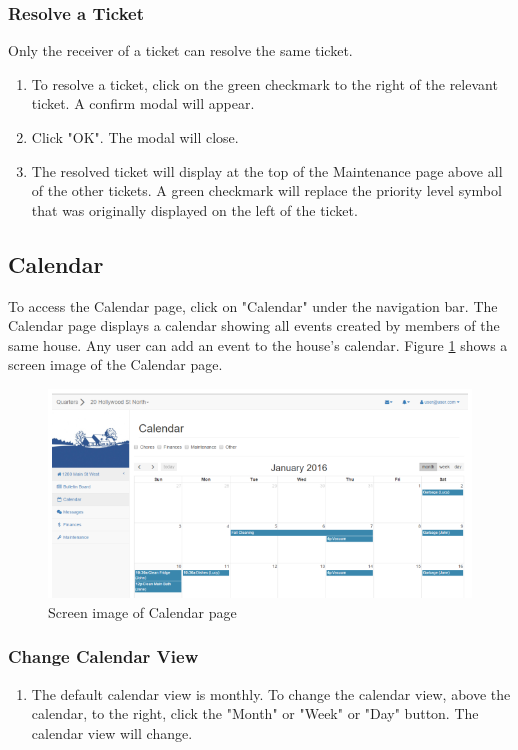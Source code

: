 \documentclass[12pt]{article}
\begin{document}
\subsubsection{Resolve a Ticket}
Only the receiver of a ticket can resolve the same ticket. 
\begin{enumerate}
\item To resolve a ticket, click on the green checkmark to the right of the relevant ticket. A confirm modal will appear. 
\item Click "OK". The modal will close.
\item The resolved ticket will display at the top of the Maintenance page above all of the other tickets. A green checkmark will replace the priority level symbol that was originally displayed on the left of the ticket.
\end{enumerate}


\subsection{Calendar}
To access the Calendar page, click on "Calendar" under the navigation bar. The Calendar page displays a calendar showing all events created by members of the same house. Any user can add an event to the house's calendar. Figure \ref{fig:calendar} shows a screen image of the Calendar page.

\begin{figure}
\centering
\includegraphics[width=\textwidth]{calendar}
\caption{Screen image of Calendar page}
\label{fig:calendar}
\end{figure}

\subsubsection{Change Calendar View}
\begin{enumerate}
\item The default calendar view is monthly. To change the calendar view, above the calendar, to the right, click the "Month" or "Week" or "Day" button. The calendar view will change.
\end{enumerate}
\end{document}
